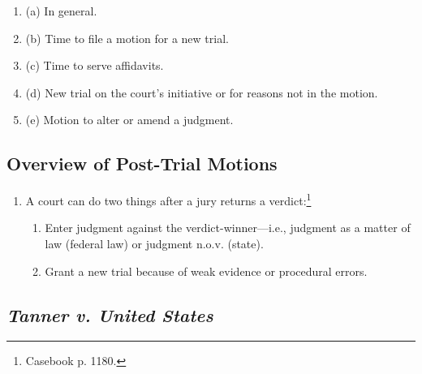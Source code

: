 \begin{enumerate}
    \item (a) In general.
    \item (b) Time to file a motion for a new trial.
    \item (c) Time to serve affidavits.
    \item (d) New trial on the court's initiative or for reasons not in the 
    motion.
    \item (e) Motion to alter or amend a judgment.
\end{enumerate}

\subsection{Overview of Post-Trial Motions}

\begin{enumerate}
    \item A court can do two things after a jury returns a 
    verdict:\footnote{Casebook p. 1180.}
    \begin{enumerate}
        \item Enter judgment against the verdict-winner---i.e., judgment as a 
        matter of law (federal law) or judgment n.o.v. (state).
        \item Grant a new trial because of weak evidence or procedural errors.
    \end{enumerate}
\end{enumerate}

\subsection{\emph{Tanner v. United States}}


